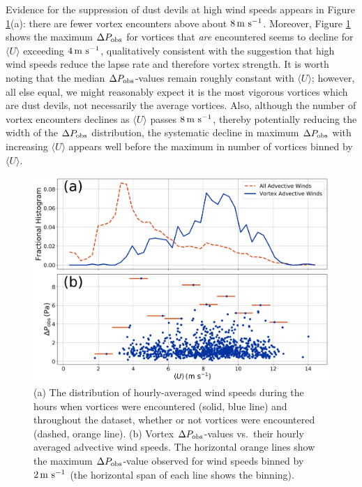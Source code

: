 \documentclass[linenumbers,trackchanges]{aastex63}
\begin{document}
{Evidence for the suppression of dust devils at high wind speeds appears in Figure \ref{fig:U_vs_DeltaP_comparisons}(a): there are fewer vortex encounters above about $8\,{\rm m\ s^{-1}}$. Moreover, Figure \ref{fig:U_vs_DeltaP_comparisons} shows the maximum $\Delta P_{\rm obs}$ for vortices that \emph{are} encountered seems to decline for $\langle U \rangle$ exceeding $4\,{\rm m\ s^{-1}}$, qualitatively consistent with the suggestion that high wind speeds reduce the lapse rate and therefore vortex strength. It is worth noting that the median $\Delta P_{\rm obs}$-values remain roughly constant with $\langle U \rangle$; however, all else equal, we might reasonably expect it is the most vigorous vortices which are dust devils, not necessarily the average vortices. Also, although the number of vortex encounters declines as $\langle U \rangle$ passes $8\, {\rm m\ s^{-1}}$, thereby potentially reducing the width of the $\Delta P_{\rm obs}$ distribution, the systematic decline in maximum $\Delta P_{\rm obs}$ with increasing $\langle U \rangle$ appears well before the maximum in number of vortices binned by $\langle U \rangle$.

\begin{figure}
    \centering
    \includegraphics[width=\textwidth]{figures/U_vs_DeltaP_comparisons.png}
    \caption{(a) The distribution of hourly-averaged wind speeds during the hours when vortices were encountered (solid, blue line) and throughout the dataset, whether or not vortices were encountered (dashed, orange line). (b) Vortex $\Delta P_{\rm obs}$-values vs.~their hourly averaged advective wind speeds. The horizontal orange lines show the maximum $\Delta P_{\rm obs}$-value observed for wind speeds binned by $2\, {\rm m\ s^{-1}}$ (the horizontal span of each line shows the binning).}
    \label{fig:U_vs_DeltaP_comparisons}
\end{figure}

}
\end{document}
